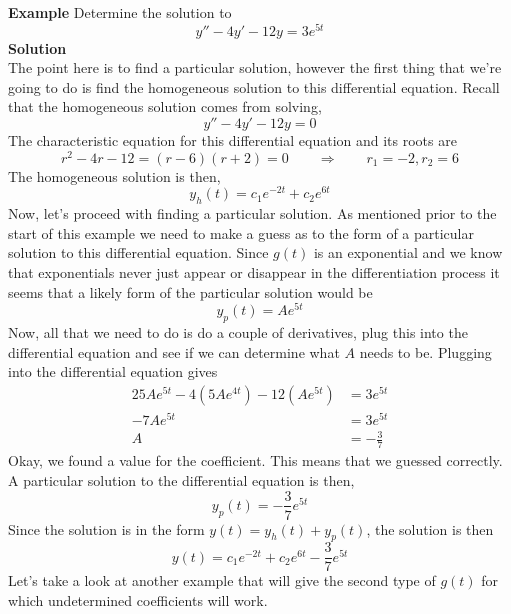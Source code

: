 \documentclass[10pt,reqno]{book}
\theoremstyle{definition}
\begin{document}
	\noindent \textbf{Example} Determine the solution to
	\[ y'' - 4y' - 12y = 3e^{5t} \]
	\textbf{Solution}\\
	The point here is to find a particular solution, however the first thing that we’re going to do is find the homogeneous solution to this differential equation. Recall that the homogeneous solution comes from solving,
	\[ y'' - 4y' - 12y = 0 \]
	The characteristic equation for this differential equation and its roots are
	\[ r^2 - 4r - 12 = (r - 6)(r + 2) = 0 \qquad \Rightarrow \qquad r_1 = -2, r_2 = 6 \]
	The homogeneous solution is then,
	\[ y_h(t) = c_1 e^{-2t} + c_2 e^{6t} \]
	Now, let's proceed with finding a particular solution. As mentioned prior to the start of this example we need to make a guess as to the form of a particular solution to this differential equation. Since $ g(t) $ is an exponential and we know that exponentials never just appear or disappear in the differentiation process it seems that a likely form of the particular solution would be
	\[ y_p(t) = Ae^{5t} \]
	Now, all that we need to do is do a couple of derivatives, plug this into the differential equation and see if we can determine what $ A $ needs to be. Plugging into the differential equation gives
	\begin{align*}
		25Ae^{5t} - 4(5Ae^{4t}) - 12(Ae^{5t}) &= 3e^{5t}\\
		-7Ae^{5t} &= 3e^{5t}\\
		A &= -\frac{3}{7}
	\end{align*}
	Okay, we found a value for the coefficient. This means that we guessed correctly. A particular solution to the differential equation is then,
	\[ y_p(t) = -\frac{3}{7}e^{5t} \]
	Since the solution is in the form $ y(t) = y_h(t) + y_p(t) $, the solution is then
	\[ y(t) = c_1 e^{-2t} + c_2 e^{6t} -\frac{3}{7}e^{5t} \]
	Let's take a look at another example that will give the second type of $ g(t) $ for which undetermined coefficients will work.
\end{document}
